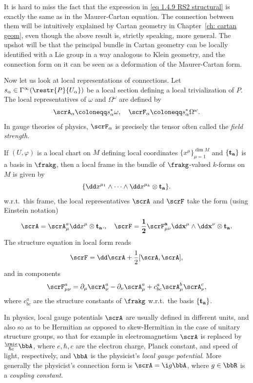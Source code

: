 \begin{rem}
    It is hard to miss the fact that the expression in \eqref{eq 1.4.9 RS2 structural} is exactly the same as in the Maurer-Cartan equation. The connection between them will be intuitively explained by Cartan geometry in Chapter~\ref{ch: cartan geom}, even though the above result is, strictly speaking, more general. The upshot will be that the principal bundle in Cartan geometry can be locally identified with a Lie group in a way analogous to Klein geometry, and the connection form on it can be seen as a deformation of the Maurer-Cartan form.
\end{rem}

Now let us look at local representations of connections. Let $s_\alpha\in\Gamma^\infty(\restr{P}{U_\alpha})$ be a local section defining  a local trivialization of $P$. The local representatives of $\omega$ and $\Omega^\omega$ are defined by
\[\scrA_\alpha\coloneqq s_\alpha^\ast\omega,\quad \scrF_\alpha\coloneqq s_\alpha^\ast \Omega^\omega.\]
In gauge theories of physics, $\scrF_\alpha$ is precisely the tensor often called the \emph{field strength}. 

\begin{rem}\label{rem 1.3.10 RS2}
    If $(U,\varphi)$ is a local chart on $M$ defining local coordinates $\{x^\mu\}_{\mu=1}^{\dim M}$ and $\{\bf{t}_a\}$ is a basis in $\frakg$, then a local frame in the bundle of $\frakg$-valued $k$-forms on $M$ is given by
    \[\{\dd x^{\mu_1}\wedge\cdots\wedge \dd x^{\mu_k}\otimes\bf{t}_a\}.\]
    w.r.t.\ this frame, the local representatives $\scrA$ and $\scrF$ take the form (using Einstein notation)
    \[\scrA=\scrA_\mu^a \dd x^\mu \otimes\bf{t}_a.,\quad \scrF=\frac12 \scrF_{\mu\nu}^a \dd x^\mu\wedge\dd x^\nu\otimes \bf{t}_a.\]
    The structure equation in local form reads
    \[\scrF=\dd\scrA+ \frac12[\scrA,\scrA],\]
    and in components
    \[\scrF_{\mu\nu}^a=\partial_\mu \scrA_\nu^a-\partial_\nu \scrA_\mu^a+c^a_{bc}\scrA^b_\mu \scrA_\nu^c,\]
    where $c^a_{bc}$ are the structure constants of $\frakg$ w.r.t.\ the basis $\{\bf{t}_a\}$.

    In physics, local gauge potentials $\scrA$ are usually defined in different units, and also so as to be Hermitian as opposed to skew-Hermitian in the case of unitary structure groups, so that for example in electromagnetism $\scrA$ is replaced by $\frac{\rmi e}{\hbar c}\bbA$, where $e,\hbar,c$ are the electron charge, Planck constant, and speed of light, respectively, and $\bbA$ is the physicist's \emph{local gauge potential}. More generally the physicist's connection form is $\scrA=\i g \bbA$, where $g\in\bbR$ is a \emph{coupling constant}.
\end{rem}


